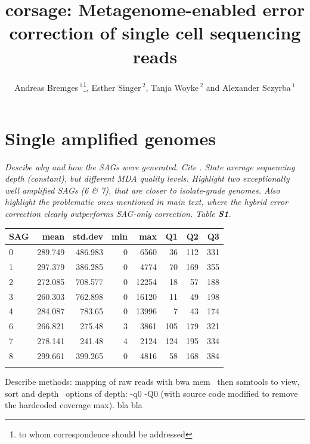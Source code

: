 \documentclass{bioinfo2}
\begin{document}
\renewcommand{\thepage}{S\arabic{page}}

\title[Metagenome-enabled error correction]{corsage: Metagenome-enabled error correction of single cell sequencing reads}

\author[Bremges \textit{et~al.}]{Andreas Bremges\,$^{1}$\footnote{to whom correspondence should be addressed}, Esther Singer\,$^{2}$, Tanja Woyke\,$^{2}$ and Alexander Sczyrba\,$^{1}$}

\address{$^{1}$Center for Biotechnology \& Faculty of Technology, Bielefeld University, 33615 Bielefeld, Germany\\
$^{2}$U.S. Department of Energy Joint Genome Institute, Walnut Creek, CA 94598, USA}

\maketitle

\section{Single amplified genomes}

\textit{Descibe why and how the SAGs were generated. Cite \citep{scott2}. State average sequencing depth (constant), but different MDA quality levels. Highlight two exceptionally well amplified SAGs (6 \& 7), that are closer to isolate-grade genomes. Also highlight the problematic ones mentioned in main text, where the hybrid error correction clearly outperforms SAG-only correction. Table \textbf{S1}.}

\begin{table}[h]
{\footnotesize
\begin{tabular}{lrrrrrrr}
\toprule
SAG  & mean & std.dev & min & max & Q1 & Q2 & Q3 \\
\midrule
0 & 289.749 & 486.983 & 0 & 6560 & 36 & 112 & 331 \\
1 & 297.379 & 386.285 & 0 & 4774 & 70 & 169 & 355 \\
2 & 272.085 & 708.577 & 0 & 12254 & 18 & 57 & 188 \\
3 & 260.303 & 762.898 & 0 & 16120 & 11 & 49 & 198 \\
4 & 284.087 & 783.65 & 0 & 13996 & 7 & 43 & 174 \\
6 & 266.821 & 275.48 & 3 & 3861 & 105 & 179 & 321 \\
7 & 278.141 & 241.48 & 4 & 2124 & 124 & 195 & 334 \\
8 & 299.661 & 399.265 & 0 & 4816 & 58 & 168 & 384 \\
\botrule
\end{tabular}}{Describe methods: mapping of raw reads with bwa mem~\citep{bwamem} then samtools to view, sort and depth~\citep{samtools} options of depth: -q0 -Q0 (with source code modified to remove the hardcoded coverage max).
bla bla}
\end{table}
\end{document}
